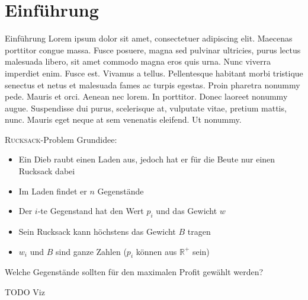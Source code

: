 \section{Einführung}

\begin{frame}{Einführung}
    Lorem ipsum dolor sit amet, consectetuer adipiscing elit. Maecenas porttitor congue massa. Fusce posuere, magna sed pulvinar ultricies, purus lectus malesuada libero, sit amet commodo magna eros quis urna.
    Nunc viverra imperdiet enim. Fusce est. Vivamus a tellus.
    Pellentesque habitant morbi tristique senectus et netus et malesuada fames ac turpis egestas. Proin pharetra nonummy pede. Mauris et orci.
    Aenean nec lorem. In porttitor. Donec laoreet nonummy augue.
    Suspendisse dui purus, scelerisque at, vulputate vitae, pretium mattis, nunc. Mauris eget neque at sem venenatis eleifend. Ut nonummy.      
\end{frame}
\begin{frame}{\textsc{Rucksack}-Problem}
    Grundidee: 
    
    \begin{itemize}
        \item Ein Dieb raubt einen Laden aus, jedoch hat er für die Beute nur einen Rucksack dabei
        \item Im Laden findet er $n$ Gegenstände
        \item Der $i$-te Gegenstand hat den Wert $p_i$ und das Gewicht $w$
        \item Sein Rucksack kann höchstens das Gewicht $B$ tragen
        \item $w_i$ und $B$ sind ganze Zahlen ($p_i$ können aus $\mathbb{R}^+$ sein)
    \end{itemize}
    \alert{Welche Gegenstände sollten für den maximalen Profit gewählt werden?} 
\end{frame}
\begin{frame}
    TODO Viz
\end{frame}
